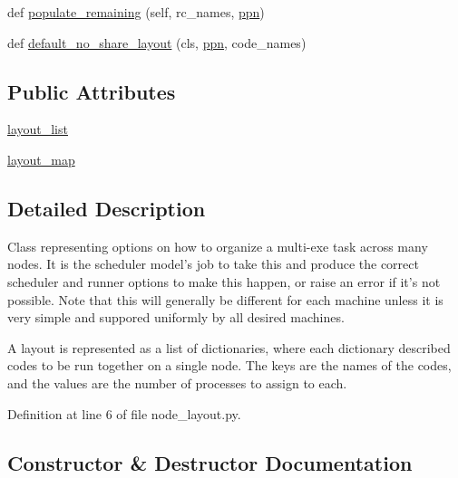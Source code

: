 \begin{DoxyCompactItemize}
\item 
def \hyperlink{classcodar_1_1savanna_1_1node__layout_1_1_node_layout_addd066236434ca6fb9813fc50bcac973}{populate\+\_\+remaining} (self, rc\+\_\+names, \hyperlink{classcodar_1_1savanna_1_1node__layout_1_1_node_layout_aa6d5b7f3721c264b0eeb3f7e7351c658}{ppn})
\item 
def \hyperlink{classcodar_1_1savanna_1_1node__layout_1_1_node_layout_afa3112f3e4b98a1ad6f1c834dd81b2d7}{default\+\_\+no\+\_\+share\+\_\+layout} (cls, \hyperlink{classcodar_1_1savanna_1_1node__layout_1_1_node_layout_aa6d5b7f3721c264b0eeb3f7e7351c658}{ppn}, code\+\_\+names)
\end{DoxyCompactItemize}
\subsection*{Public Attributes}
\begin{DoxyCompactItemize}
\item 
\hyperlink{classcodar_1_1savanna_1_1node__layout_1_1_node_layout_af27f209b198b9491d57d2bb3e65abc34}{layout\+\_\+list}
\item 
\hyperlink{classcodar_1_1savanna_1_1node__layout_1_1_node_layout_a4bda626f4487b5078f83744cf7d32b7d}{layout\+\_\+map}
\end{DoxyCompactItemize}


\subsection{Detailed Description}
\begin{DoxyVerb}Class representing options on how to organize a multi-exe task across
many nodes. It is the scheduler model's job to take this and produce the
correct scheduler and runner options to make this happen, or raise an error
if it's not possible. Note that this will generally be different for each
machine unless it is very simple and suppored uniformly by all desired
machines.

A layout is represented as a list of dictionaries, where each dictionary
described codes to be run together on a single node. The keys are
the names of the codes, and the values are the number of processes to
assign to each.
\end{DoxyVerb}
 

Definition at line 6 of file node\+\_\+layout.\+py.



\subsection{Constructor \& Destructor Documentation}
\mbox{\label{classcodar_1_1savanna_1_1node__layout_1_1_node_layout_af898ee59a1a5f520328a53d3b60a62d0}} 
